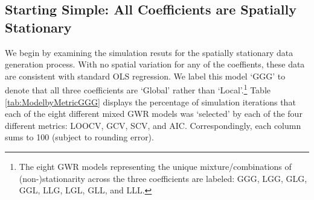 \documentclass{article}\usepackage[]{graphicx}\usepackage[]{color}
\begin{document}
\subsection{Starting Simple: All Coefficients are Spatially Stationary}

We begin by examining the simulation resuts for the spatially stationary data generation process. With no spatial variation for any of the coeffients, these data are consistent with standard OLS regression. We label this model `GGG' to denote that all three coefficients are `Global' rather than `Local'.\footnote{The eight GWR models representing the unique mixture/combinations of (non-)stationarity across the three coefficients are labeled: GGG, LGG, GLG, GGL, LLG, LGL, GLL, and LLL.} Table \ref{tab:ModelbyMetricGGG} displays the percentage of simulation iterations that each of the eight different mixed GWR models was `selected' by each of the four different metrics: LOOCV, GCV, SCV, and AIC. Correspondingly, each column sums to 100 (subject to rounding error). 
\end{document}
